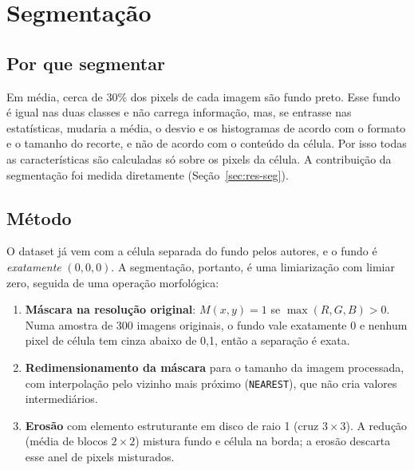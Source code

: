 \documentclass[11pt,a4paper]{article}
\begin{document}
\section{Segmentação}\label{sec:segmentacao}

\subsection{Por que segmentar}

Em média, cerca de 30\% dos pixels de cada imagem são fundo preto. Esse fundo é igual nas duas classes e
não carrega informação, mas, se entrasse nas estatísticas, mudaria a média, o desvio e os histogramas
de acordo com o formato e o tamanho do recorte, e não de acordo com o conteúdo da célula. Por isso
todas as características são calculadas só sobre os pixels da célula. A contribuição da segmentação
foi medida diretamente (Seção~\ref{sec:res-seg}).

\subsection{Método}

O dataset já vem com a célula separada do fundo pelos autores, e o fundo é \emph{exatamente}
$(0,0,0)$. A segmentação, portanto, é uma limiarização com limiar zero, seguida de uma operação
morfológica:
\begin{enumerate}
  \item \textbf{Máscara na resolução original}: $M(x,y)=1$ se $\max(R,G,B)>0$. Numa amostra de 300
        imagens originais, o fundo vale exatamente 0 e nenhum pixel de célula tem cinza abaixo de
        0,1, então a separação é exata.
  \item \textbf{Redimensionamento da máscara} para o tamanho da imagem processada, com interpolação
        pelo vizinho mais próximo (\texttt{NEAREST}), que não cria valores intermediários.
  \item \textbf{Erosão} com elemento estruturante em disco de raio 1 (cruz $3\times3$). A redução
        (média de blocos $2\times2$) mistura fundo e célula na borda; a erosão descarta esse anel de
        pixels misturados.
\end{enumerate}
\end{document}
